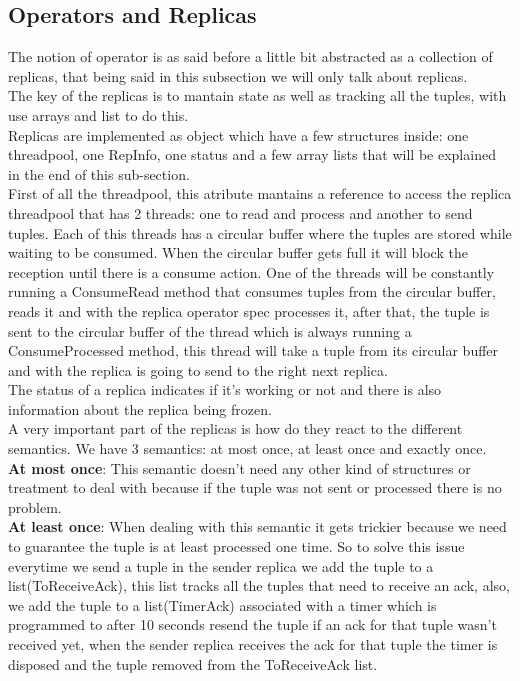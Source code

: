 \documentclass[times, 10pt, twocolumn]{article}
\begin{document}
\subsection{Operators and Replicas}
The notion of operator is as said before a little bit abstracted as a collection of replicas, that being said in this subsection we will only talk about replicas. 
\\The key of the replicas is to mantain state as well as tracking all the tuples, with use arrays and list to do this.
\\Replicas are implemented as object which have a few structures inside: one threadpool, one RepInfo, one status and a few array lists that will be explained in the end of this sub-section.
\\First of all the threadpool, this atribute mantains a reference to access the replica threadpool that has 2 threads: one to read and process and another to send tuples. Each of this threads has a circular buffer where the tuples are stored while waiting to be consumed. When the circular buffer gets full it will block the reception until there is a consume action. One of the threads will be constantly running a ConsumeRead method that consumes tuples from the circular buffer, reads it and with the replica operator spec processes it, after that, the tuple is sent to the circular buffer of the thread which is always running a ConsumeProcessed method, this thread will take a tuple from its circular buffer and with the replica is going to send to the right next replica.
\\The status of a replica indicates if it's working or not and there is also information about the replica being frozen.
\\A very important part of the replicas is how do they react to the different semantics. We have 3 semantics: at most once, at least once and exactly once.
\\\textbf{At most once}: This semantic doesn't need any other kind of structures or treatment to deal with because if the tuple was not sent or processed there is no problem.
\\\textbf{At least once}: When dealing with this semantic it gets trickier because we need to guarantee the tuple is at least processed one time. So to solve this issue everytime we send a tuple in the sender replica we add the tuple to a list(ToReceiveAck), this list tracks all the tuples that need to receive an ack, also, we add the tuple to a list(TimerAck) associated with a timer which is programmed to after 10 seconds resend the tuple if an ack for that tuple wasn't received yet, when the sender replica receives the ack for that tuple the timer is disposed and the tuple removed from the ToReceiveAck list.
\end{document}
